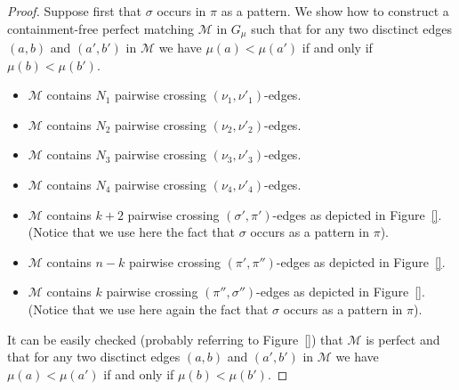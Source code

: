\documentclass[a4paper,10pt]{llncs}
\begin{document}
\begin{proof}
  Suppose first that $\sigma$ occurs in $\pi$ as a pattern.
  We show how to construct a containment-free perfect matching
  $\mathcal{M}$ in $G_\mu$ such that
  for any two disctinct edges
  $(a, b)$ and $(a', b')$ in $\mathcal{M}$
  we have $\mu(a) < \mu(a')$ if and only if $\mu(b) < \mu(b')$.
  \begin{itemize}
    \item $\mathcal{M}$ contains $N_1$ pairwise crossing
    $(\nu_1, \nu'_1)$-edges.
    \item $\mathcal{M}$ contains $N_2$ pairwise crossing
    $(\nu_2, \nu'_2)$-edges.
    \item $\mathcal{M}$ contains $N_3$ pairwise crossing
    $(\nu_3, \nu'_3)$-edges.
    \item $\mathcal{M}$ contains $N_4$ pairwise crossing
    $(\nu_4, \nu'_4)$-edges.
    \item $\mathcal{M}$ contains $k+2$ pairwise crossing
    $(\sigma', \pi')$-edges as depicted in Figure~\ref{}.
    (Notice that we use here the fact that $\sigma$ occurs as a pattern in $\pi$).
    \item $\mathcal{M}$ contains $n-k$ pairwise crossing
    $(\pi', \pi'')$-edges as depicted in Figure~\ref{}.
    \item $\mathcal{M}$ contains $k$ pairwise crossing
    $(\pi'', \sigma'')$-edges as depicted in Figure~\ref{}.
    (Notice that we use here again the fact that $\sigma$ occurs as a pattern in $\pi$).
  \end{itemize}
  It can be easily checked (probably referring to Figure~\ref{}) that
  $\mathcal{M}$ is perfect and that
  for any two disctinct edges
  $(a, b)$ and $(a', b')$ in $\mathcal{M}$
  we have $\mu(a) < \mu(a')$ if and only if $\mu(b) < \mu(b')$.



\end{proof}
\end{document}
